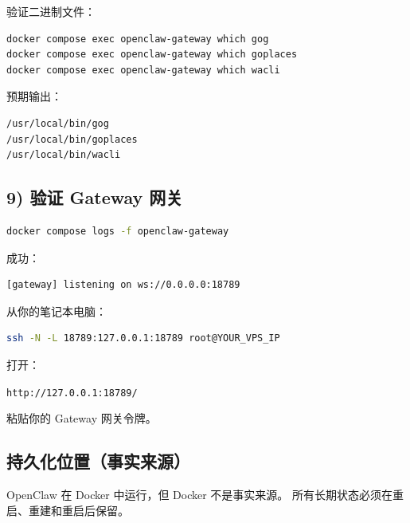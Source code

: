 验证二进制文件：

\begin{lstlisting}[language=bash]
docker compose exec openclaw-gateway which gog
docker compose exec openclaw-gateway which goplaces
docker compose exec openclaw-gateway which wacli
\end{lstlisting}


预期输出：

\begin{lstlisting}
/usr/local/bin/gog
/usr/local/bin/goplaces
/usr/local/bin/wacli
\end{lstlisting}


\hrulefill


\subsection{9) 验证 Gateway 网关}


\begin{lstlisting}[language=bash]
docker compose logs -f openclaw-gateway
\end{lstlisting}


成功：

\begin{lstlisting}
[gateway] listening on ws://0.0.0.0:18789
\end{lstlisting}


从你的笔记本电脑：

\begin{lstlisting}[language=bash]
ssh -N -L 18789:127.0.0.1:18789 root@YOUR_VPS_IP
\end{lstlisting}


打开：

\texttt{http://127.0.0.1:18789/}

粘贴你的 Gateway 网关令牌。

\hrulefill


\subsection{持久化位置（事实来源）}


OpenClaw 在 Docker 中运行，但 Docker 不是事实来源。
所有长期状态必须在重启、重建和重启后保留。


